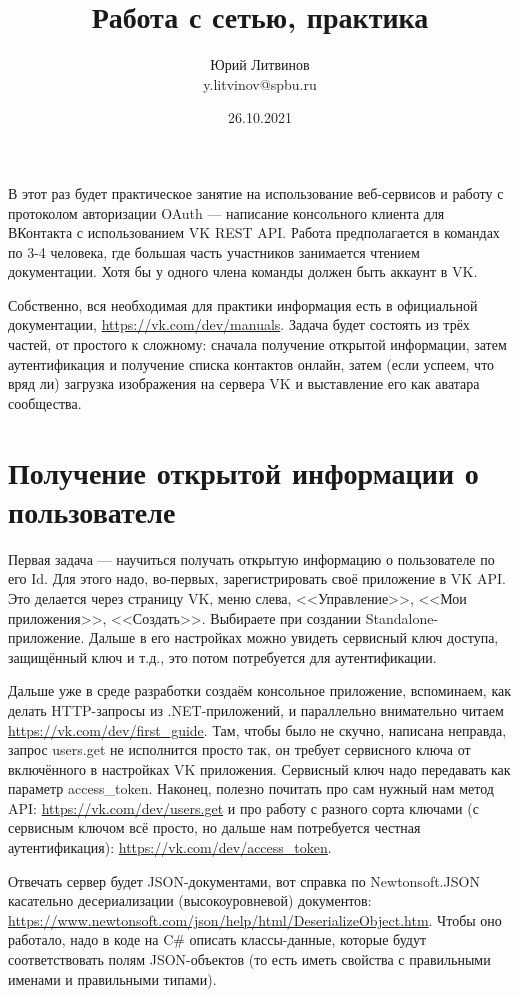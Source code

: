 \documentclass[a5paper]{article}
\title{Работа с сетью, практика}
\author{Юрий Литвинов\\\small{y.litvinov@spbu.ru}}
\date{26.10.2021}
\begin{document}
\maketitle
\thispagestyle{empty}

В этот раз будет практическое занятие на использование веб-сервисов и работу с протоколом авторизации OAuth --- написание консольного клиента для ВКонтакта с использованием VK REST API. Работа предполагается в командах по 3-4 человека, где большая часть участников занимается чтением документации. Хотя бы у одного члена команды должен быть аккаунт в VK.

Собственно, вся необходимая для практики информация есть в официальной документации, \url{https://vk.com/dev/manuals}. Задача будет состоять из трёх частей, от простого к сложному: сначала получение открытой информации, затем аутентификация и получение списка контактов онлайн, затем (если успеем, что вряд ли) загрузка изображения на сервера VK и выставление его как аватара сообщества.

\section{Получение открытой информации о пользователе}

Первая задача --- научиться получать открытую информацию о пользователе по его Id. Для этого надо, во-первых, зарегистрировать своё приложение в VK API. Это делается через страницу VK, меню слева, <<Управление>>, <<Мои приложения>>, <<Создать>>. Выбираете при создании Standalone-приложение. Дальше в его настройках можно увидеть сервисный ключ доступа, защищённый ключ и т.д., это потом потребуется для аутентификации.

Дальше уже в среде разработки создаём консольное приложение, вспоминаем, как делать HTTP-запросы из .NET-приложений, и параллельно внимательно читаем \url{https://vk.com/dev/first_guide}. Там, чтобы было не скучно, написана неправда, запрос users.get не исполнится просто так, он требует сервисного ключа от включённого в настройках VK приложения. Сервисный ключ надо передавать как параметр access\_token. Наконец, полезно почитать про сам нужный нам метод API: \url{https://vk.com/dev/users.get} и про работу с разного сорта ключами (с сервисным ключом всё просто, но дальше нам потребуется честная аутентификация): \url{https://vk.com/dev/access_token}.

Отвечать сервер будет JSON-документами, вот справка по Newtonsoft.JSON касательно десериализации (высокоуровневой) документов: \url{https://www.newtonsoft.com/json/help/html/DeserializeObject.htm}. Чтобы оно работало, надо в коде на C\# описать классы-данные, которые будут соответствовать полям JSON-объектов (то есть иметь свойства с правильными именами и правильными типами).
\end{document}
